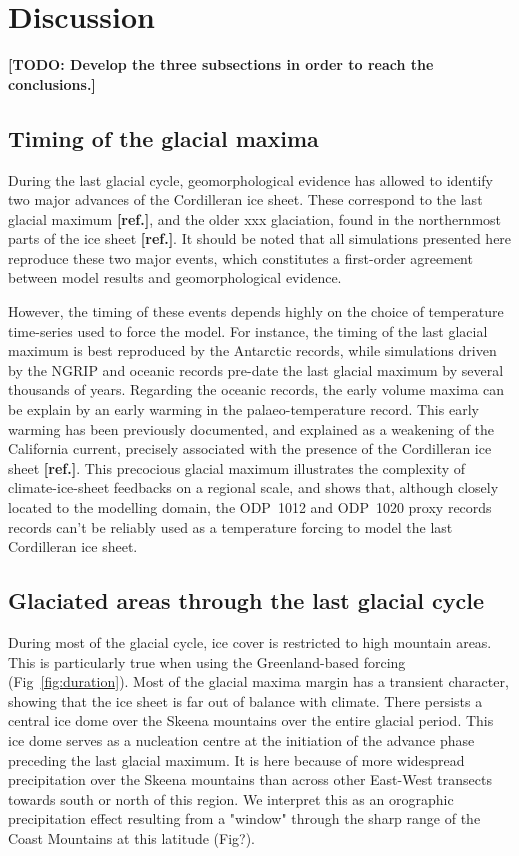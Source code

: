 \documentclass[tc, ms]{copernicus}
\newcommand{\todo}[1]{\textbf{[TODO: #1]}}
\newcommand{\aref}[0]{\textbf{[ref.]}}
\begin{document}
\section{Discussion}
\label{sec:discussion}

\todo{Develop the three subsections in order to reach the conclusions.}

\subsection{Timing of the glacial maxima}

During the last glacial cycle, geomorphological evidence has allowed to
identify two major advances of the Cordilleran ice sheet. These correspond to
the last glacial maximum \aref, and the older xxx glaciation, found in the
northernmost parts of the ice sheet \aref. It should be noted that all
simulations presented here reproduce these two major events, which constitutes
a first-order agreement between model results and geomorphological evidence.

However, the timing of these events depends highly on the choice of temperature
time-series used to force the model. For instance, the timing of the last
glacial maximum is best reproduced by the Antarctic records, while simulations
driven by the NGRIP and oceanic records pre-date the last glacial maximum by
several thousands of years. Regarding the oceanic records, the early volume
maxima can be explain by an early warming in the palaeo-temperature record.
This early warming has been previously documented, and explained as a
weakening of the California current, precisely associated with the presence of
the Cordilleran ice sheet \aref. This precocious glacial maximum illustrates
the complexity of climate-ice-sheet feedbacks on a regional scale, and shows
that, although closely located to the modelling domain, the ODP~1012 and
ODP~1020 proxy records records can't be reliably used as a temperature forcing
to model the last Cordilleran ice sheet.

\subsection{Glaciated areas through the last glacial cycle}

During most of the glacial cycle, ice cover is restricted to high mountain
areas. This is particularly true when using the Greenland-based forcing
(Fig~\ref{fig:duration}). Most of the glacial maxima margin has a transient
character, showing that the ice sheet is far out of balance with climate. There
persists a central ice dome over the Skeena mountains over the entire glacial
period. This ice dome serves as a nucleation centre at the initiation of the
advance phase preceding the last glacial maximum. It is here because of more
widespread precipitation over the Skeena mountains than across other East-West
transects towards south or north of this region. We interpret this as an
orographic precipitation effect resulting from a "window" through the sharp
range of the Coast Mountains at this latitude (Fig?).
\end{document}
